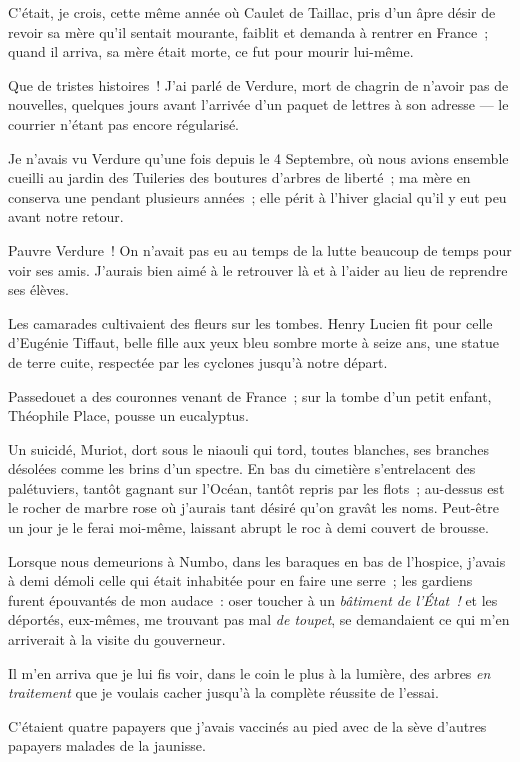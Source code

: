\documentclass[french,twoside]{book} %
\begin{document}
C’était, je crois, cette même année où Caulet de Taillac, pris d’un âpre désir de revoir sa mère qu’il sentait mourante, faiblit et demanda à rentrer en France ; quand il arriva, sa mère était morte, ce fut pour mourir lui-même.\par
Que de tristes histoires ! J’ai parlé de Verdure, mort de chagrin de n’avoir pas de nouvelles,  quelques jours avant l’arrivée d’un paquet de lettres à son adresse — le courrier n’étant pas encore régularisé.\par
Je n’avais vu Verdure qu’une fois depuis le 4 Septembre, où nous avions ensemble cueilli au jardin des Tuileries des boutures d’arbres de liberté ; ma mère en conserva une pendant plusieurs années ; elle périt à l’hiver glacial qu’il y eut peu avant notre retour.\par
Pauvre Verdure ! On n’avait pas eu au temps de la lutte beaucoup de temps pour voir ses amis. J’aurais bien aimé à le retrouver là et à l’aider au lieu de reprendre ses élèves.\par
Les camarades cultivaient des fleurs sur les tombes. Henry Lucien fit pour celle d’Eugénie Tiffaut, belle fille aux yeux bleu sombre morte à seize ans, une statue de terre cuite, respectée par les cyclones jusqu’à notre départ.\par
Passedouet a des couronnes venant de France ; sur la tombe d’un petit enfant, Théophile Place, pousse un eucalyptus.\par
Un suicidé, Muriot, dort sous le niaouli qui tord, toutes blanches, ses branches désolées comme les brins d’un spectre. En bas du cimetière s’entrelacent des palétuviers, tantôt gagnant sur l’Océan, tantôt repris par les flots ; au-dessus est le rocher de marbre rose où j’aurais  tant désiré qu’on gravât les noms. Peut-être un jour je le ferai moi-même, laissant abrupt le roc à demi couvert de brousse.\par
Lorsque nous demeurions à Numbo, dans les baraques en bas de l’hospice, j’avais à demi démoli celle qui était inhabitée pour en faire une serre ; les gardiens furent épouvantés de mon audace : oser toucher à un \emph{bâtiment de l’État !} et les déportés, eux-mêmes, me trouvant pas mal \emph{de toupet}, se demandaient ce qui m’en arriverait à la visite du gouverneur.\par
Il m’en arriva que je lui fis voir, dans le coin le plus à la lumière, des arbres \emph{en traitement} que je voulais cacher jusqu’à la complète réussite de l’essai.\par
C’étaient quatre papayers que j’avais vaccinés au pied avec de la sève d’autres papayers malades de la jaunisse.\par
\end{document}
